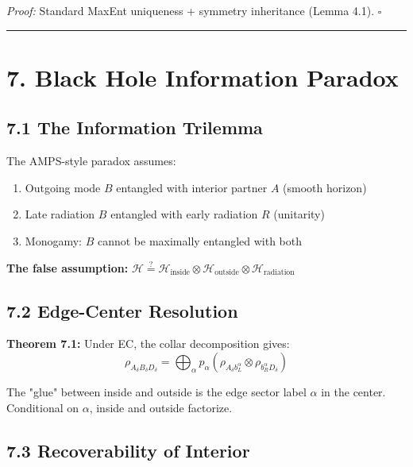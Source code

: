 \emph{Proof:} Standard MaxEnt uniqueness + symmetry inheritance (Lemma 4.1). \(\square\)

\begin{center}\rule{0.5\linewidth}{0.5pt}\end{center}

\section{7. Black Hole Information Paradox}\label{7-black-hole-information-paradox}

\subsection{7.1 The Information Trilemma}\label{71-the-information-trilemma}

The AMPS-style paradox assumes:

\begin{enumerate}
\def\labelenumi{\arabic{enumi}.}
\tightlist
\item
  Outgoing mode \(B\) entangled with interior partner \(A\) (smooth horizon)
\item
  Late radiation \(B\) entangled with early radiation \(R\) (unitarity)
\item
  Monogamy: \(B\) cannot be maximally entangled with both
\end{enumerate}

\textbf{The false assumption:} \(\mathcal{H} \stackrel{?}{=} \mathcal{H}_{\text{inside}} \otimes \mathcal{H}_{\text{outside}} \otimes \mathcal{H}_{\text{radiation}}\)

\subsection{7.2 Edge-Center Resolution}\label{72-edge-center-resolution}

\textbf{Theorem 7.1:} Under EC, the collar decomposition gives: \[\rho_{A_\delta B_\delta D_\delta} = \bigoplus_\alpha p_\alpha \left(\rho_{A_\delta b_L^\alpha} \otimes \rho_{b_R^\alpha D_\delta}\right)\]

The "glue" between inside and outside is the edge sector label \(\alpha\) in the center. Conditional on \(\alpha\), inside and outside factorize.

\subsection{7.3 Recoverability of Interior}\label{73-recoverability-of-interior}

